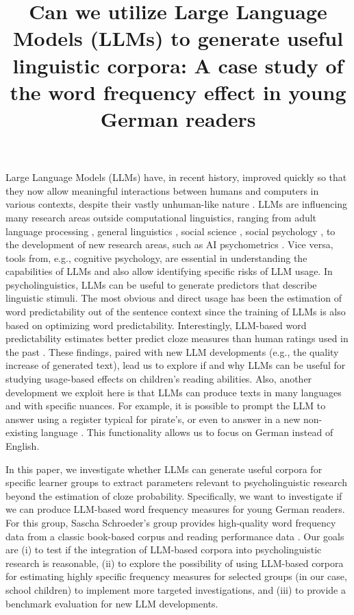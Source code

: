 \documentclass[jou, a4paper]{apa7}
\title{Can we utilize Large Language Models (LLMs) to generate useful linguistic corpora: A case study of the word frequency effect in young German readers}
\begin{document}
\maketitle

Large Language Models (LLMs) have, in recent history, improved quickly so that they now allow meaningful interactions between humans and computers in various contexts, despite their vastly unhuman-like nature \citep{min_recent_2021, singhal_large_2023, kasneci_chatgpt_2023}. LLMs are influencing many research areas outside computational linguistics, ranging from adult language processing \citep{cai_does_2023}, general linguistics \citep{piantadosi_modern_2023}, social science \citep{ziems_can_2023}, social psychology \citep{park_correct_2023}, to the development of new research areas, such as AI psychometrics \citep{pellert_ai_2022}. Vice versa, tools from, e.g., cognitive psychology, are essential in understanding the capabilities of LLMs \citep{binz_using_2023} and also allow identifying specific risks of LLM usage. In psycholinguistics, LLMs can be useful to generate predictors that describe linguistic stimuli. The most obvious and direct usage has been the estimation of word predictability out of the sentence context \citep{hofmann_language_2022, chandra_synthetic_2023, heilbron_prediction_2021} since the training of LLMs is also based on optimizing word predictability. Interestingly, LLM-based word predictability estimates better predict cloze measures than human ratings used in the past \citep[e.g. ][]{kliegl_length_2004, hawelka_dual-route_2010, hawelka_forward_2015, staub_effect_2015}. These findings, paired with new LLM developments (e.g., the quality increase of generated text), lead us to explore if and why LLMs can be useful for studying usage-based effects on children's reading abilities. Also, another development we exploit here is that LLMs can produce texts in many languages and with specific nuances. For example, it is possible to prompt the LLM to answer using a register typical for pirate's, or even to answer in a new non-existing language \citep{diamond_genlangs_2023}. This functionality allows us to focus on German instead of English.

In this paper, we investigate whether LLMs can generate useful corpora for specific learner groups to extract parameters relevant to psycholinguistic research beyond the estimation of cloze probability. Specifically, we want to investigate if we can produce LLM-based word frequency measures for young German readers. For this group, Sascha Schroeder's group provides high-quality word frequency data from a classic book-based corpus \citep{schroeder_childlex_2015} and reading performance data \citep{schroter_developmental_2017}. Our goals are (i) to test if the integration of LLM-based corpora into psycholinguistic research is reasonable, (ii) to explore the possibility of using LLM-based corpora for estimating highly specific frequency measures for selected groups (in our case, school children) to implement more targeted investigations, and (iii) to provide a benchmark evaluation for new LLM developments.
\end{document}
